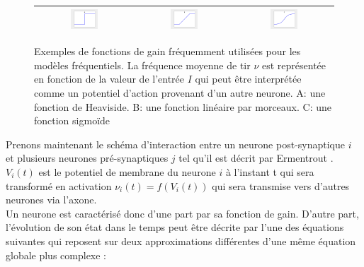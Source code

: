 \begin{figure}[htbp]
\begin{center}
\begin{tabular}{|c|c|c|}
\hline
\includegraphics[width=0.3\textwidth]{figures/ch1_4_profile-heaviside}
&
\includegraphics[width=0.3\textwidth]{figures/ch1_4_profile-linear}
&
\includegraphics[width=0.3\textwidth]{figures/ch1_4_profile-sigmoid}\\
\hline
\end{tabular}
\end{center}
\caption{Exemples de fonctions de gain fréquemment utilisées pour les modèles fréquentiels. La fréquence moyenne de tir $\nu$ est représentée en fonction de la valeur de l'entrée $I$ qui peut être interprétée comme un potentiel d'action provenant d'un autre neurone. A: une fonction de Heaviside. B: une fonction linéaire par morceaux. C: une fonction sigmoïde }
\label{gain}
\end{figure}

Prenons maintenant le schéma d'interaction entre un neurone post-synaptique $i$ et plusieurs neurones pré-synaptiques $j$ tel qu'il est décrit par Ermentrout \cite{Ermentrout:1980}. $V_i(t)$ est le potentiel de membrane du neurone $i$ à l'instant t qui sera transformé en activation $\nu_i(t)=f(V_i(t))$ qui sera transmise vers d'autres neurones via l'axone.\\

Un neurone est caractérisé donc d'une part par sa fonction de gain. D'autre part, l'évolution de son état dans le temps peut être décrite par l'une des équations suivantes qui reposent sur deux approximations différentes d'une même équation globale plus complexe : 

